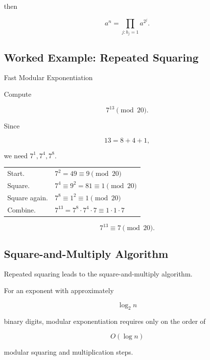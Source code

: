 then

\[ a^n=\prod_{j:b_j=1}a^{2^j}. \]

\subsection{Worked Example: Repeated Squaring}
\label{subsec:worked-repeated-squaring}

\begin{workedexamplebox}{Fast Modular Exponentiation}

Compute

\[ 7^{13}\pmod{20}. \]

Since

\[ 13=8+4+1, \]

we need \(7^1,7^4,7^8\).

\begin{tabularx}{\textwidth}{@{}>{\raggedright\arraybackslash}p{}X@{}}
Start. & \(7^2=49\equiv9\pmod{20}\)\\
Square. & \(7^4\equiv9^2=81\equiv1\pmod{20}\)\\
Square again. & \(7^8\equiv1^2\equiv1\pmod{20}\)\\
Combine. & \(7^{13}=7^8\cdot7^4\cdot7\equiv1\cdot1\cdot7\)
\end{tabularx}

\begin{answerbox}
\[ \boxed{7^{13}\equiv7\pmod{20}.} \]
\end{answerbox}
\end{workedexamplebox}

\subsection{Square-and-Multiply Algorithm}
\label{subsec:square-and-multiply}

Repeated squaring leads to the square-and-multiply algorithm.

For an exponent with approximately

\[ \log_2 n \]

binary digits, modular exponentiation requires only on the order of

\[ O(\log n) \]

modular squaring and multiplication steps.

